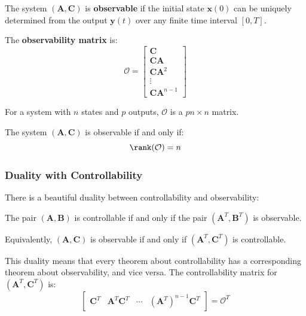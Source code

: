 \begin{definition}[Observability]
The system $(\mathbf{A}, \mathbf{C})$ is \textbf{observable} if the initial state $\mathbf{x}(0)$ can be uniquely determined from the output $\mathbf{y}(t)$ over any finite time interval $[0, T]$.
\end{definition}

The \textbf{observability matrix} is:
\begin{equation}
\mathcal{O} = \begin{bmatrix} \mathbf{C} \\ \mathbf{C}\mathbf{A} \\ \mathbf{C}\mathbf{A}^2 \\ \vdots \\ \mathbf{C}\mathbf{A}^{n-1} \end{bmatrix}
\label{eq:observability_matrix}
\end{equation}

For a system with $n$ states and $p$ outputs, $\mathcal{O}$ is a $pn \times n$ matrix.

\begin{theorem}
The system $(\mathbf{A}, \mathbf{C})$ is observable if and only if:
\begin{equation}
\rank(\mathcal{O}) = n
\end{equation}
\end{theorem}

\subsubsection{Duality with Controllability}

There is a beautiful duality between controllability and observability:

\begin{theorem}
The pair $(\mathbf{A}, \mathbf{B})$ is controllable if and only if the pair $(\mathbf{A}^T, \mathbf{B}^T)$ is observable.

Equivalently, $(\mathbf{A}, \mathbf{C})$ is observable if and only if $(\mathbf{A}^T, \mathbf{C}^T)$ is controllable.
\end{theorem}

This duality means that every theorem about controllability has a corresponding theorem about observability, and vice versa. The controllability matrix for $(\mathbf{A}^T, \mathbf{C}^T)$ is:
\begin{equation}
\begin{bmatrix} \mathbf{C}^T & \mathbf{A}^T\mathbf{C}^T & \cdots & (\mathbf{A}^T)^{n-1}\mathbf{C}^T \end{bmatrix} = \mathcal{O}^T
\end{equation}


